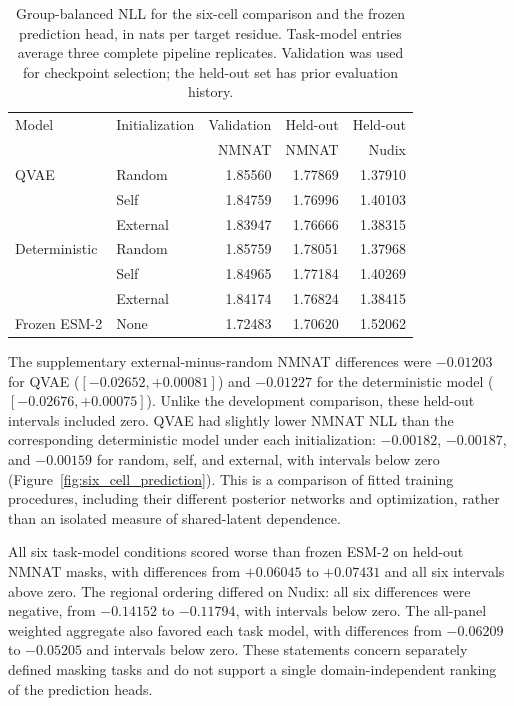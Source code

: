 \documentclass[referee,pdflatex,sn-vancouver-num]{sn-jnl}
\begin{document}
\begin{table}[ht]
\centering
\small
\caption{Group-balanced NLL for the six-cell comparison and the frozen prediction head, in nats per target residue. Task-model entries average three complete pipeline replicates. Validation was used for checkpoint selection; the held-out set has prior evaluation history.}\label{tab:six_cell_nll}
\begin{tabular}{llrrr}
\toprule
Model & Initialization & Validation & Held-out & Held-out \\
 & & NMNAT & NMNAT & Nudix \\
\midrule
QVAE & Random & 1.85560 & 1.77869 & 1.37910 \\
 & Self & 1.84759 & 1.76996 & 1.40103 \\
 & External & 1.83947 & 1.76666 & 1.38315 \\
Deterministic & Random & 1.85759 & 1.78051 & 1.37968 \\
 & Self & 1.84965 & 1.77184 & 1.40269 \\
 & External & 1.84174 & 1.76824 & 1.38415 \\
Frozen ESM-2 & None & 1.72483 & 1.70620 & 1.52062 \\
\bottomrule
\end{tabular}
\end{table}

The supplementary external-minus-random NMNAT differences were $-0.01203$ for QVAE ($[-0.02652,+0.00081]$) and $-0.01227$ for the deterministic model ($[-0.02676,+0.00075]$). Unlike the development comparison, these held-out intervals included zero. QVAE had slightly lower NMNAT NLL than the corresponding deterministic model under each initialization: $-0.00182$, $-0.00187$, and $-0.00159$ for random, self, and external, with intervals below zero (Figure~\ref{fig:six_cell_prediction}). This is a comparison of fitted training procedures, including their different posterior networks and optimization, rather than an isolated measure of shared-latent dependence.

All six task-model conditions scored worse than frozen ESM-2 on held-out NMNAT masks, with differences from $+0.06045$ to $+0.07431$ and all six intervals above zero. The regional ordering differed on Nudix: all six differences were negative, from $-0.14152$ to $-0.11794$, with intervals below zero. The all-panel weighted aggregate also favored each task model, with differences from $-0.06209$ to $-0.05205$ and intervals below zero. These statements concern separately defined masking tasks and do not support a single domain-independent ranking of the prediction heads.
\end{document}
